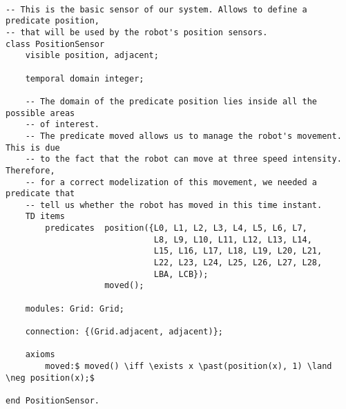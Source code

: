 \begin{lstlisting}[fontadjust, mathescape, frame=single]
    
-- This is the basic sensor of our system. Allows to define a predicate position,
-- that will be used by the robot's position sensors.   
class PositionSensor
    visible position, adjacent;

    temporal domain integer;

    -- The domain of the predicate position lies inside all the possible areas
    -- of interest. 
    -- The predicate moved allows us to manage the robot's movement. This is due
    -- to the fact that the robot can move at three speed intensity. Therefore, 
    -- for a correct modelization of this movement, we needed a predicate that 
    -- tell us whether the robot has moved in this time instant.
    TD items 
        predicates  position({L0, L1, L2, L3, L4, L5, L6, L7,
                              L8, L9, L10, L11, L12, L13, L14,
                              L15, L16, L17, L18, L19, L20, L21,
                              L22, L23, L24, L25, L26, L27, L28,
                              LBA, LCB});
                    moved();

    modules: Grid: Grid;

    connection: {(Grid.adjacent, adjacent)};

    axioms
        moved:$ moved() \iff \exists x \past(position(x), 1) \land \neg position(x);$

end PositionSensor.\end{lstlisting}